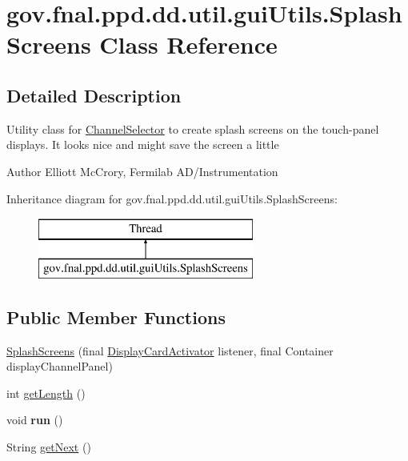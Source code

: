 \hypertarget{classgov_1_1fnal_1_1ppd_1_1dd_1_1util_1_1guiUtils_1_1SplashScreens}{\section{gov.\-fnal.\-ppd.\-dd.\-util.\-gui\-Utils.\-Splash\-Screens Class Reference}
\label{classgov_1_1fnal_1_1ppd_1_1dd_1_1util_1_1guiUtils_1_1SplashScreens}
}


\subsection{Detailed Description}
Utility class for \hyperlink{classgov_1_1fnal_1_1ppd_1_1dd_1_1ChannelSelector}{Channel\-Selector} to create splash screens on the touch-\/panel displays. It looks nice and might save the screen a little

\begin{DoxyAuthor}{Author}
Elliott Mc\-Crory, Fermilab A\-D/\-Instrumentation 
\end{DoxyAuthor}
Inheritance diagram for gov.\-fnal.\-ppd.\-dd.\-util.\-gui\-Utils.\-Splash\-Screens\-:\begin{figure}[H]
\begin{center}
\leavevmode
\includegraphics[height=2.000000cm]{classgov_1_1fnal_1_1ppd_1_1dd_1_1util_1_1guiUtils_1_1SplashScreens}
\end{center}
\end{figure}
\subsection*{Public Member Functions}
\begin{DoxyCompactItemize}
\item 
\hyperlink{classgov_1_1fnal_1_1ppd_1_1dd_1_1util_1_1guiUtils_1_1SplashScreens_a3b01fff5fc7c9d20e1229bd9441d66ce}{Splash\-Screens} (final \hyperlink{interfacegov_1_1fnal_1_1ppd_1_1dd_1_1interfaces_1_1DisplayCardActivator}{Display\-Card\-Activator} listener, final Container display\-Channel\-Panel)
\item 
int \hyperlink{classgov_1_1fnal_1_1ppd_1_1dd_1_1util_1_1guiUtils_1_1SplashScreens_aa72109c01206e7fc3866440d8d9680be}{get\-Length} ()
\item 
\hypertarget{classgov_1_1fnal_1_1ppd_1_1dd_1_1util_1_1guiUtils_1_1SplashScreens_af5353d7417b0c9b0c3955e34fc40619c}{void {\bfseries run} ()}\label{classgov_1_1fnal_1_1ppd_1_1dd_1_1util_1_1guiUtils_1_1SplashScreens_af5353d7417b0c9b0c3955e34fc40619c}

\item 
String \hyperlink{classgov_1_1fnal_1_1ppd_1_1dd_1_1util_1_1guiUtils_1_1SplashScreens_a19bce9c642238c470303f72048935cd1}{get\-Next} ()
\end{DoxyCompactItemize}


